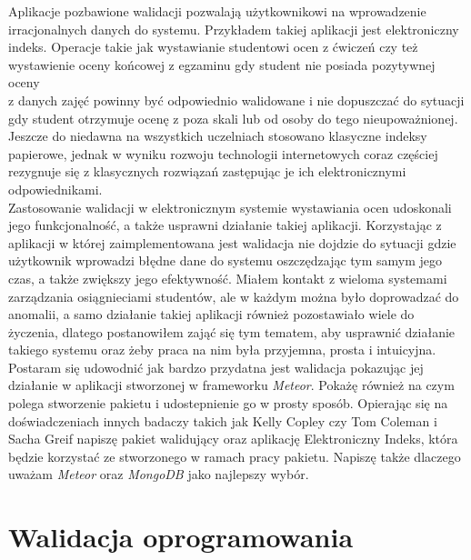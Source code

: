 \documentclass[brudnopis]{xmgr}
\begin{document}
\textcolor{wa}{Aplikacje pozbawione walidacji pozwalają użytkownikowi na wprowadzenie
irracjonalnych danych do systemu.} \textcolor{wb}{Przykładem takiej aplikacji jest elektroniczny indeks.
Operacje takie jak wystawianie studentowi ocen z ćwiczeń czy też wystawienie
oceny końcowej z egzaminu gdy student nie posiada pozytywnej oceny
\\
z danych zajęć powinny być odpowiednio
walidowane i nie dopuszczać do sytuacji gdy student otrzymuje ocenę z poza skali lub od osoby do tego nieupoważnionej.}
\textcolor{wb}{Jeszcze do niedawna na wszystkich uczelniach stosowano klasyczne indeksy papierowe,
jednak w wyniku rozwoju technologii internetowych coraz częściej rezygnuje się z klasycznych
rozwiązań zastępując je ich elektronicznymi odpowiednikami.}
\\

\textcolor{wc}{Zastosowanie walidacji w elektronicznym
systemie wystawiania ocen udoskonali jego funkcjonalność, a także usprawni działanie takiej aplikacji.
Korzystając z aplikacji w której zaimplementowana jest walidacja nie dojdzie do sytuacji gdzie użytkownik wprowadzi błędne dane do systemu oszczędzając tym samym jego czas, a także zwiększy jego efektywność. 
Miałem kontakt z wieloma systemami zarządzania osiągnieciami studentów, ale w każdym można było doprowadzać
do anomalii, a samo działanie takiej aplikacji również pozostawiało wiele do życzenia, dlatego postanowiłem zająć się tym tematem,
aby usprawnić działanie takiego systemu oraz żeby praca na nim była przyjemna, prosta i intuicyjna. }
\\

\textcolor{wa}{Postaram się udowodnić jak bardzo przydatna jest walidacja pokazując jej działanie w aplikacji
stworzonej w frameworku \textit{Meteor}. Pokażę również na czym polega stworzenie pakietu i udostepnienie
go w prosty sposób.} \textcolor{wd}{Opierając się na doświadczeniach innych badaczy takich jak Kelly Copley \cite{Mesosphere}
czy Tom Coleman i Sacha Greif \cite{DiscoverMeteor2013} napiszę pakiet walidujący oraz aplikację Elektroniczny Indeks,
która będzie korzystać ze stworzonego w ramach pracy pakietu.} \textcolor{wa}{Napiszę także dlaczego uważam \textit{Meteor} oraz \textit{MongoDB} jako najlepszy wybór.}




\chapter{Walidacja oprogramowania}
\end{document}
